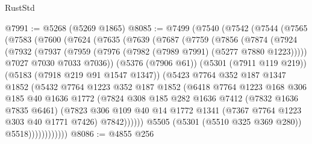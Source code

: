 \begin{lexlean}{RustStd}
\begin{coremodule}
@7991 := @5268 (@5269 @1865)
@8085 := @7499
    (@7540
      (@7542
        (@7544
          (@7565
            (@7583
              (@7600
                (@7624
                  (@7635
                    (@7639
                      (@7687
                        (@7759
                          (@7856
                            (@7874
                              (@7924
                                (@7932
                                  (@7937 (@7959 (@7976 (@7982 (@7989 @7991) (@5277 @7880 @1223)))))
                                  @7027
                                  @7030
                                  @7033
                                  @7036))
                              (@5376 (@7906 @61))
                              (@5301 (@7911 @119 @219))
                              (@5183 (@7918 @219 @91 @1547 @1347))
                              (@5423
                                @7764
                                @352
                                @187
                                @1347
                                @1852
                                (@5432
                                  @7764
                                  @1223
                                  @352
                                  @187
                                  @1852
                                  (@6418
                                    @7764
                                    @1223
                                    @168
                                    @306
                                    @185
                                    @40
                                    @1636
                                    @1772
                                    (@7824
                                      @308
                                      @185
                                      @282
                                      @1636
                                      @7412
                                      (@7832 @1636 @7835 @6461)
                                      (@7823
                                        @306
                                        @109
                                        @40
                                        @14
                                        @1772
                                        @1341
                                        (@7367 @7764 @1223 @303 @40 @1771 @7426)
                                        @7842))))))
                            @5505
                            (@5301 (@5510 @325 @369 @280))
                            @5518))))))))))))
@8086 := @4855 @256

\end{coremodule}
\end{lexlean}
